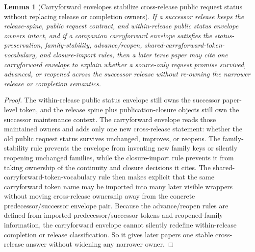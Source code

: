 \documentclass[11pt]{article}
\newtheorem{lemma}{Lemma}
\begin{document}
\begin{lemma}[Carryforward envelopes stabilize cross-release public request status without replacing release or completion owners]
If a successor release keeps the release-spine, public request contract, and within-release public status envelope owners intact, and if a companion carryforward envelope satisfies the status-preservation, family-stability, advance/reopen, shared-carryforward-token-vocabulary, and closure-import rules, then a later terse paper may cite one carryforward envelope to explain whether a source-only request promise survived, advanced, or reopened across the successor release without re-owning the narrower release or completion semantics.
\end{lemma}

\begin{proof}
The within-release public status envelope still owns the successor paper-level token, and the release spine plus publication-closure objects still own the successor maintenance context.
The carryforward envelope reads those maintained owners and adds only one new cross-release statement: whether the old public request status survives unchanged, improves, or reopens.
The family-stability rule prevents the envelope from inventing new family keys or silently reopening unchanged families, while the closure-import rule prevents it from taking ownership of the continuity and closure decisions it cites.
The shared-carryforward-token-vocabulary rule then makes explicit that the same carryforward token name may be imported into many later visible wrappers without moving cross-release ownership away from the concrete predecessor/successor envelope pair.
Because the advance/reopen rules are defined from imported predecessor/successor tokens and reopened-family information, the carryforward envelope cannot silently redefine within-release completion or release classification.
So it gives later papers one stable cross-release answer without widening any narrower owner.\qedhere
\end{proof}
\end{document}
